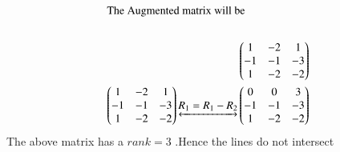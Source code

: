\documentclass[journal,12pt,twocolumn]{IEEEtran}
\begin{document}
\begin{align}
    \intertext{The Augmented matrix will be}\\
    \begin{pmatrix}1 & -2 & 1\\-1 & -1 & -3\\1 & -2 & -2\end{pmatrix}\\
    \begin{pmatrix}1 & -2 & 1\\-1 & -1 & -3\\1 & -2 & -2\end{pmatrix}\underleftrightarrow{R_1=R_1-R_2}\begin{pmatrix}0 & 0 & 3\\-1 & -1 & -3\\1 & -2 & -2\end{pmatrix}
\end{align}
The above matrix has a $rank=3$ .Hence the lines do not intersect
\end{document}
